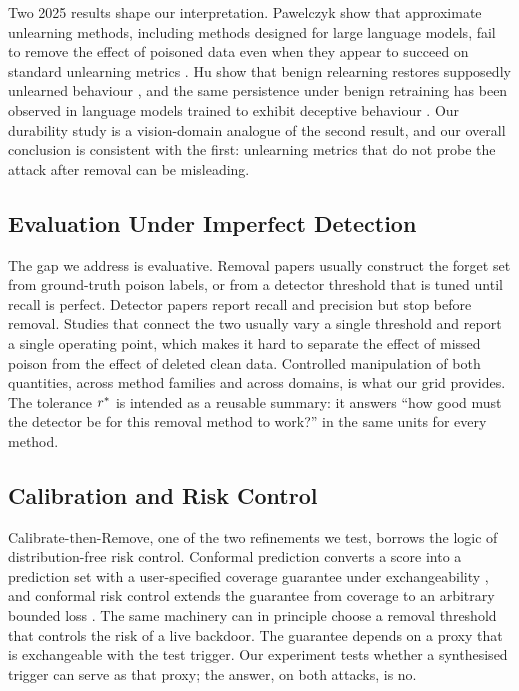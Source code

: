 Two 2025 results shape our interpretation. Pawelczyk \etal{} show that
approximate unlearning methods, including methods designed for large language
models, fail to remove the effect of poisoned data even when they appear to
succeed on standard unlearning metrics \cite{pawelczyk}. Hu \etal{} show that
benign relearning restores supposedly unlearned behaviour \cite{jogging}, and
the same persistence under benign retraining has been observed in language
models trained to exhibit deceptive behaviour \cite{sleeper}. Our
durability study is a vision-domain analogue of the second result, and our
overall conclusion is consistent with the first: unlearning metrics that do not
probe the attack after removal can be misleading.

\subsection{Evaluation Under Imperfect Detection}
The gap we address is evaluative. Removal papers usually construct the forget
set from ground-truth poison labels, or from a detector threshold that is tuned
until recall is perfect. Detector papers report recall and precision but stop
before removal. Studies that connect the two usually vary a single threshold and
report a single operating point, which makes it hard to separate the effect of
missed poison from the effect of deleted clean data. Controlled manipulation of
both quantities, across method families and across domains, is what our grid
provides. The tolerance $r^{\ast}$ is intended as a reusable summary: it answers
``how good must the detector be for this removal method to work?'' in the same
units for every method.

\subsection{Calibration and Risk Control}
Calibrate-then-Remove, one of the two refinements we test, borrows the logic of
distribution-free risk control. Conformal prediction converts a score into a
prediction set with a user-specified coverage guarantee under exchangeability
\cite{vovk,angelopoulos}, and conformal risk control extends the guarantee from
coverage to an arbitrary bounded loss \cite{crc}. The same machinery can in
principle choose a removal threshold that controls the risk of a live backdoor. The
guarantee depends on a proxy that is exchangeable with the test trigger. Our
experiment tests whether a synthesised trigger can serve as that proxy; the
answer, on both attacks, is no.

